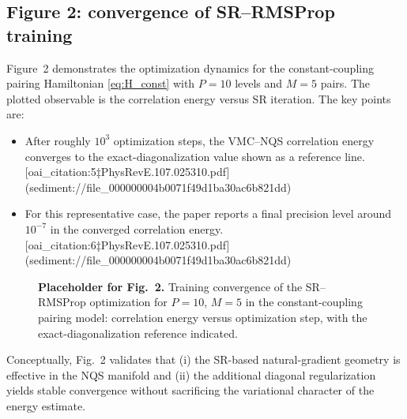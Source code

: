 \subsection{Figure 2: convergence of SR--RMSProp training}
Figure~2 demonstrates the optimization dynamics for the constant-coupling pairing Hamiltonian
\eqref{eq:H_const} with $P=10$ levels and $M=5$ pairs. The plotted observable is the correlation energy versus SR
iteration. The key points are:
\begin{itemize}
\item After roughly $10^3$ optimization steps, the VMC--NQS correlation energy converges to the exact-diagonalization
value shown as a reference line.  [oai_citation:5‡PhysRevE.107.025310.pdf](sediment://file_000000004b0071f49d1ba30ac6b821dd)
\item For this representative case, the paper reports a final precision level around $10^{-7}$ in the converged correlation
energy.  [oai_citation:6‡PhysRevE.107.025310.pdf](sediment://file_000000004b0071f49d1ba30ac6b821dd)
\end{itemize}

\begin{figure}[t]
\centering
\fbox{\rule{0pt}{48mm}\rule{0.92\linewidth}{0pt}}
\caption{\textbf{Placeholder for Fig.\ 2.} Training convergence of the SR--RMSProp optimization for $P=10$, $M=5$ in the
constant-coupling pairing model: correlation energy versus optimization step, with the exact-diagonalization reference indicated.}
\label{fig:fig2_placeholder}
\end{figure}

Conceptually, Fig.~2 validates that (i) the SR-based natural-gradient geometry is effective in the NQS manifold and
(ii) the additional diagonal regularization yields stable convergence without sacrificing the variational character of the
energy estimate. 

